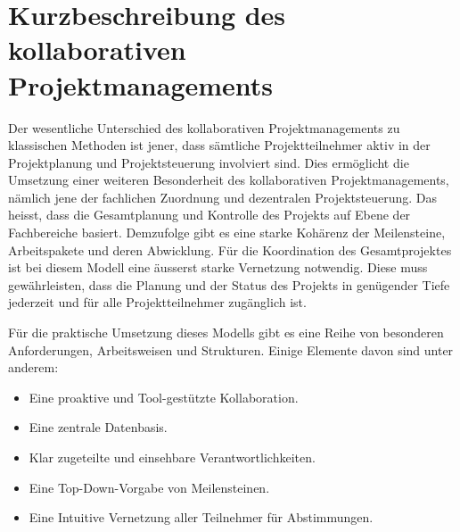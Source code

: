 \section{Kurzbeschreibung des kollaborativen Projektmanagements}
Der wesentliche Unterschied des kollaborativen Projektmanagements zu
klassischen Methoden ist jener, dass sämtliche Projektteilnehmer aktiv
in der Projektplanung und Projektsteuerung involviert sind. Dies
ermöglicht die Umsetzung einer weiteren Besonderheit des kollaborativen
Projektmanagements, nämlich jene der fachlichen Zuordnung und dezentralen
Projektsteuerung. Das heisst, dass die Gesamtplanung und Kontrolle des
Projekts auf Ebene der Fachbereiche basiert. Demzufolge gibt es eine starke
Kohärenz der Meilensteine, Arbeitspakete und deren Abwicklung. Für die
Koordination des Gesamtprojektes ist bei diesem Modell eine äusserst
starke Vernetzung notwendig. Diese muss gewährleisten, dass die Planung
und der Status des Projekts in genügender Tiefe jederzeit und für alle
Projektteilnehmer zugänglich ist.

Für die praktische Umsetzung dieses Modells gibt es eine Reihe von
besonderen Anforderungen, Arbeitsweisen und Strukturen. Einige Elemente
davon sind unter anderem:

\begin{itemize}
	\item Eine proaktive und Tool-gestützte Kollaboration.
	\item Eine zentrale Datenbasis.
	\item Klar zugeteilte und einsehbare Verantwortlichkeiten.
	\item Eine Top-Down-Vorgabe von Meilensteinen.
	\item Eine Intuitive Vernetzung aller Teilnehmer für Abstimmungen.
\end{itemize}
